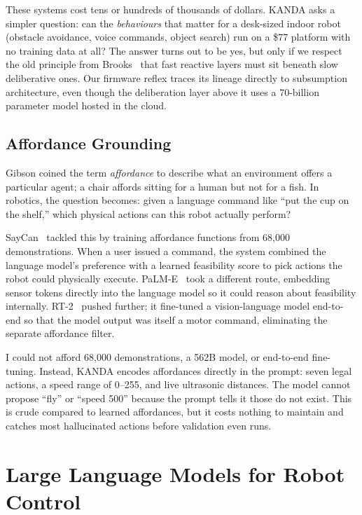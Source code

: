 These systems cost tens or hundreds of thousands of dollars. KANDA asks a simpler question: can the \textit{behaviours} that matter for a desk-sized indoor robot (obstacle avoidance, voice commands, object search) run on a \$77 platform with no training data at all? The answer turns out to be yes, but only if we respect the old principle from Brooks~\cite{brooks1986robust} that fast reactive layers must sit beneath slow deliberative ones. Our firmware reflex traces its lineage directly to subsumption architecture, even though the deliberation layer above it uses a 70-billion parameter model hosted in the cloud.

\subsection{Affordance Grounding}
\label{subsec:affordance}

Gibson coined the term \textit{affordance} to describe what an environment offers a particular agent; a chair affords sitting for a human but not for a fish. In robotics, the question becomes: given a language command like ``put the cup on the shelf,'' which physical actions can this robot actually perform?

SayCan~\cite{ahn2022saycan} tackled this by training affordance functions from 68,000 demonstrations. When a user issued a command, the system combined the language model's preference with a learned feasibility score to pick actions the robot could physically execute. PaLM-E~\cite{driess2023palme} took a different route, embedding sensor tokens directly into the language model so it could reason about feasibility internally. RT-2~\cite{brohan2023rt2} pushed further; it fine-tuned a vision-language model end-to-end so that the model output was itself a motor command, eliminating the separate affordance filter.

I could not afford 68,000 demonstrations, a 562B model, or end-to-end fine-tuning. Instead, KANDA encodes affordances directly in the prompt: seven legal actions, a speed range of 0--255, and live ultrasonic distances. The model cannot propose ``fly'' or ``speed 500'' because the prompt tells it those do not exist. This is crude compared to learned affordances, but it costs nothing to maintain and catches most hallucinated actions before validation even runs.


\section{Large Language Models for Robot Control}
\label{sec:llm_robot}


